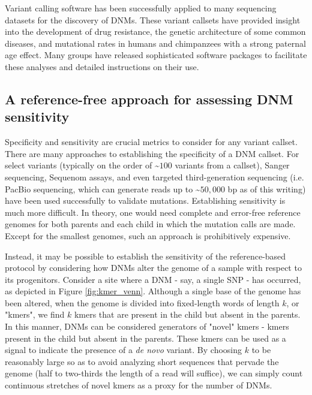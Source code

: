 Variant calling software has been successfully applied to many sequencing datasets for the discovery of DNMs.  These variant callsets have provided insight into the development of drug resistance\cite{Woodford:2007it}, the genetic architecture of some common diseases\cite{Neale:2012ki}, and mutational rates in humans and chimpanzees with a strong paternal age effect\cite{Conrad:2011eh,Venn:2014ep,Kloosterman:2015cn,Francioli:2015kj}.  Many groups have released sophisticated software packages to facilitate these analyses and detailed instructions on their use\cite{DePristo:2011fo,Rimmer:2014ho}.

\subsection{A reference-free approach for assessing DNM sensitivity}

Specificity and sensitivity are crucial metrics to consider for any variant callset.  There are many approaches to establishing the specificity of a DNM callset.  For select variants (typically on the order of \textasciitilde $100$ variants from a callset), Sanger sequencing, Sequenom assays, and even targeted third-generation sequencing (i.e. PacBio sequencing, which can generate reads up to \textasciitilde $50,000$ bp as of this writing) have been used successfully to validate mutations.  Establishing sensitivity is much more difficult.  In theory, one would need complete and error-free reference genomes for both parents and each child in which the mutation calls are made.  Except for the smallest genomes, such an approach is prohibitively expensive.

Instead, it may be possible to establish the sensitivity of the reference-based protocol by considering how DNMs alter the genome of a sample with respect to its progenitors.  Consider a site where a DNM - say, a single SNP - has occurred, as depicted in Figure \ref{fig:kmer_venn}.  Although a single base of the genome has been altered, when the genome is divided into fixed-length words of length $k$, or "kmers", we find $k$ kmers that are present in the child but absent in the parents.  In this manner, DNMs can be considered generators of "novel" kmers - kmers present in the child but absent in the parents.  These kmers can be used as a signal to indicate the presence of a \textit{de novo} variant.  By choosing $k$ to be reasonably large so as to avoid analyzing short sequences that pervade the genome (half to two-thirds the length of a read will suffice), we can simply count continuous stretches of novel kmers as a proxy for the number of DNMs.

